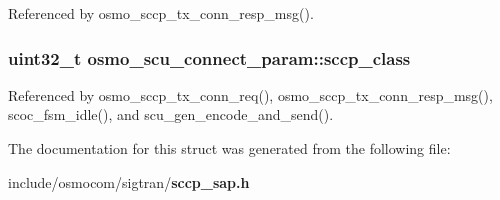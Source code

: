 Referenced by osmo\+\_\+sccp\+\_\+tx\+\_\+conn\+\_\+resp\+\_\+msg().

\subsubsection[{sccp\+\_\+class}]{\setlength{\rightskip}{0pt plus 5cm}uint32\+\_\+t osmo\+\_\+scu\+\_\+connect\+\_\+param\+::sccp\+\_\+class}\label{structosmo__scu__connect__param_a3f8e22756f5007e12d1265a0f8d352dd}


Referenced by osmo\+\_\+sccp\+\_\+tx\+\_\+conn\+\_\+req(), osmo\+\_\+sccp\+\_\+tx\+\_\+conn\+\_\+resp\+\_\+msg(), scoc\+\_\+fsm\+\_\+idle(), and scu\+\_\+gen\+\_\+encode\+\_\+and\+\_\+send().



The documentation for this struct was generated from the following file\+:\begin{DoxyCompactItemize}
\item 
include/osmocom/sigtran/{\bf sccp\+\_\+sap.\+h}\end{DoxyCompactItemize}
